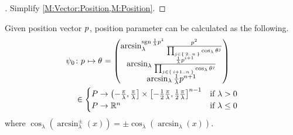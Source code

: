 \documentclass[../main.tex]{subfiles}
\begin{document}
\begin{proof}[]
Simplify \cref{M:Vector:Position,M:Position}.
\end{proof}
\begin{lemma}\label{M:Parameter:Value}
Given position vector $\tensor{p}{}$, position parameter can be calculated as the following.
\begin{align*}
\psi_0
&\colon\tensor{p}{}\mapsto\tensor{\theta}{}
=
\begin{pmatrix}
\arcsin_\lambda^{\sign{\frac{1}{\lambda}\tensor{p}{^1}}}{\frac{\tensor{p}{^2}}{\prod_{j\in\Set{2..n}}{\cos_\lambda{\tensor{\theta}{^j}}}}}\\
\arcsin_\lambda{\frac{\frac{1}{\lambda}\tensor{p}{^{i+1}}}{\prod_{j\in\Set{i+1..n}}{\cos_\lambda{\tensor{\theta}{^j}}}}}\\
\arcsin_\lambda{\frac{1}{\lambda}\tensor{p}{^{n+1}}}\\
\end{pmatrix}\\
&\in
\begin{cases}
P\to\left(-\frac{\pi}{\lambda},\frac{\pi}{\lambda}\right]\times\left[-\frac{1}{2}\frac{\pi}{\lambda},\frac{1}{2}\frac{\pi}{\lambda}\right]^{n-1}&\text{if $\lambda>0$}\\
P\to\R^{n}&\text{if $\lambda\le0$}\\
\end{cases}
\end{align*}
where $\cos_\lambda\left(\arcsin_\lambda^{\pm}\left(x\right)\right) =\pm\cos_\lambda\left(\arcsin_\lambda\left(x\right)\right)$.
\end{lemma}
\end{document}
